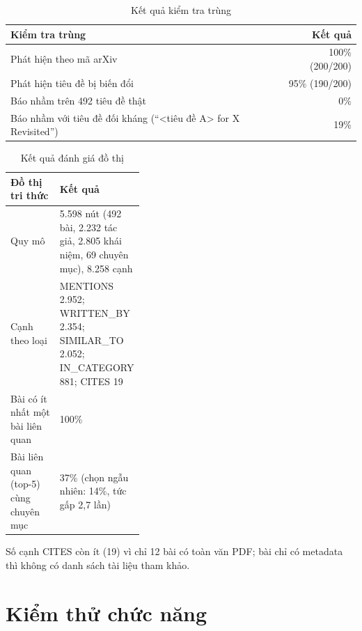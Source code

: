 \begin{table}[H]
\centering\small{}
\begin{tabularx}{\linewidth}{@{}Lr@{}}
\toprule
\textbf{Kiểm tra trùng} & \textbf{Kết quả}\\
\midrule
Phát hiện theo mã arXiv & 100\% (200/200)\\
Phát hiện tiêu đề bị biến đổi & 95\% (190/200)\\
Báo nhầm trên 492 tiêu đề thật & 0\%\\
Báo nhầm với tiêu đề đối kháng (``<tiêu đề A> for X Revisited'') & 19\%\\
\bottomrule
\end{tabularx}
\caption{Kết quả kiểm tra trùng}\label{tab:dedup}
\end{table}

\begin{table}[H]
\centering\small{}
\begin{tabularx}{\linewidth}{@{}P{0.38\linewidth}L@{}}
\toprule
\textbf{Đồ thị tri thức} & \textbf{Kết quả}\\
\midrule
Quy mô & 5.598 nút (492 bài, 2.232 tác giả, 2.805 khái niệm, 69 chuyên mục), 8.258 cạnh\\
Cạnh theo loại & MENTIONS 2.952; WRITTEN\_BY 2.354; SIMILAR\_TO 2.052; IN\_CATEGORY 881; CITES 19\\
Bài có ít nhất một bài liên quan & 100\%\\
Bài liên quan (top-5) cùng chuyên mục & 37\% (chọn ngẫu nhiên: 14\%, tức gấp 2,7 lần)\\
\bottomrule
\end{tabularx}
\caption{Kết quả đánh giá đồ thị}\label{tab:graph}
\end{table}

Số cạnh CITES còn ít (19) vì chỉ 12 bài có toàn văn PDF; bài chỉ có metadata thì không có danh sách tài liệu
tham khảo.

\section{Kiểm thử chức năng}

